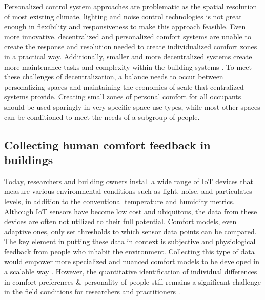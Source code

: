 \documentclass[]{interact}
\theoremstyle{plain}%
\theoremstyle{definition}
\theoremstyle{remark}
\begin{document}
Personalized control system approaches are problematic as the spatial resolution of most existing climate, lighting and noise control technologies is not great enough in flexibility and responsiveness to make this approach feasible. Even more innovative, decentralized and personalized comfort systems are unable to create the response and resolution needed to create individualized comfort zones in a practical way. Additionally, smaller and more decentralized systems create more maintenance tasks and complexity within the building systems \citep{VESELY2017223}. To meet these challenges of decentralization, a balance needs to occur between personalizing spaces and maintaining the economies of scale that centralized systems provide. Creating small zones of personal comfort for all occupants should be used sparingly in very specific space use types, while most other spaces can be conditioned to meet the needs of a subgroup of people. 

\subsection{Collecting human comfort feedback in buildings}
Today, researchers and building owners install a wide range of IoT devices that measure various environmental conditions such as light, noise, and particulates levels, in addition to the conventional temperature and humidity metrics. Although IoT sensors have become low cost and ubiquitous, the data from these devices are often not utilized to their full potential. Comfort models, even adaptive ones, only set thresholds to which sensor data points can be compared. The key element in putting these data in context is subjective and physiological feedback from people who inhabit the environment. Collecting this type of data would empower more specialized and nuanced comfort models to be developed in a scalable way \citep{ltpaper}. However, the quantitative identification of individual differences in comfort preferences \& personality of people still remains a significant challenge in the field conditions for researchers and practitioners \citep{WANG2018181}.

\end{document}

